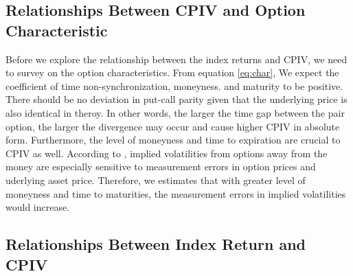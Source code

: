 

\subsection{Relationships Between CPIV and Option Characteristic}
Before we explore the relationship between the index returns and CPIV, we need to survey on the option characteristics. From equation \ref{eq:char}, We expect the coefficient of time non-synchronization, moneyness. and maturity to be positive. There should be no deviation in put-call parity given that the underlying price is also identical in theroy. In other words, the larger the time gap between the pair option, the larger the divergence may occur and cause higher CPIV in absolute form. Furthermore, the level of moneyness and time to expiration are crucial to CPIV as well. According to \textcite{hentschel2003errors}, implied volatilities from options away from the money are especially sensitive to measurement errors in option prices and uderlying asset price. Therefore, we estimates that with greater level of moneyness and time to maturities, the measurement errors in implied volatilities would increase. 

\subsection{Relationships Between Index Return and CPIV}